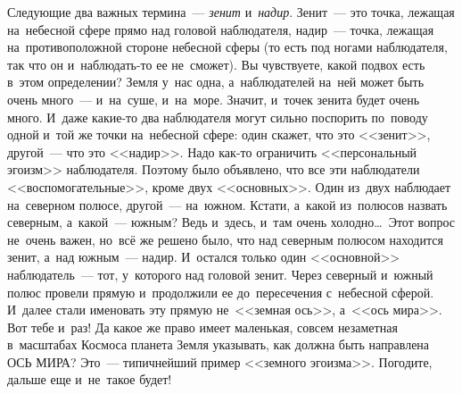 Следующие два важных термина~--- \textit{зенит} и~\textit{надир}. Зенит~--- это точка, лежащая на~небесной сфере
прямо над головой наблюдателя, надир~--- точка, лежащая на~противоположной стороне небесной сферы
(то есть под ногами наблюдателя, так что он и~наблюдать-то ее не~сможет). Вы чувствуете, какой
подвох есть в~этом определении? Земля у~нас одна, а~наблюдателей на~ней может быть очень много~---
и~на~суше, и~на~море. Значит, и~точек зенита будет очень много. И~даже какие-то два наблюдателя
могут сильно поспорить по~поводу одной и~той же точки на~небесной сфере: один скажет, что это
<<зенит>>, другой~--- что это <<надир>>. Надо как-то ограничить <<персональный эгоизм>> наблюдателя.
Поэтому было объявлено, что все эти наблюдатели <<воспомогательные>>, кроме двух <<основных>>. Один
из~двух наблюдает на~северном полюсе, другой~--- на~южном. Кстати, а~какой из~полюсов назвать
северным, а~какой~--- южным? Ведь и~здесь, и~там очень холодно\ldots\ Этот вопрос не~очень важен,
но~всё же решено было, что над северным полюсом находится зенит, а~над южным~--- надир. И~остался
только один <<основной>> наблюдатель~--- тот, у~которого над головой зенит. Через северный и~южный
полюс провели прямую и~продолжили ее до~пересечения с~небесной сферой. И~далее стали именовать эту
прямую не~<<земная ось>>, а~<<ось мира>>. Вот тебе и~раз! Да какое же право имеет маленькая, совсем
незаметная в~масштабах Космоса планета Земля указывать, как должна быть направлена ОСЬ МИРА?
Это~--- типичнейший пример <<земного эгоизма>>. Погодите, дальше еще и~не~такое будет!


